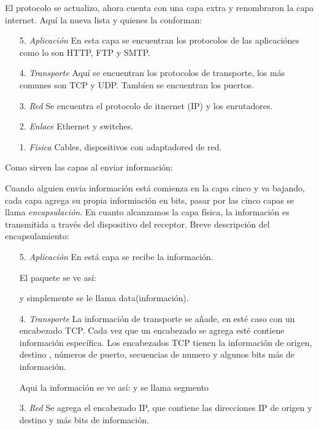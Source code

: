 \documentclass[8pt, letterpaper]{article}
\begin{document}
\begin{enumerate}
      \hfill\break
      El protocolo se actualizo, ahora cuenta con una capa extra y renombraron
      la capa internet. Aquí la nueva lista y quienes la conforman:
      \begin{enumerate}
      \item[5.]\textit{Aplicación}
        \hfill\break
        En esta capa se encuentran los protocolos de las aplicaciónes como
        lo son HTTP, FTP y SMTP.
      \item[4.] \textit{Transporte}
        Aquí se encuentran los protocolos de transporte, los más comunes son
        TCP y UDP. Tambíen se encuentran los puertos.
      \item[3.] \textit{Red}
        Se encuentra el protocolo de itnernet (IP) y los enrutadores.
      \item[2.] \textit{Enlace}
        Ethernet y switches.
      \item[1.]\textit{Fisica}
        Cables, dispositivos con adaptadored de red.
      \end{enumerate}
      Como sirven las capas al enviar información:
      
      Cuando alguien envia información está comienza en la capa cinco y va
      bajando, cada capa agrega su propia informiación en bits, pasar por las
      cinco capas se llama \textit{encapsulación}. En cuanto alcanzamos la
      capa física, la información es transmitida a través del dispositivo del
      receptor. Breve descripción del encapsulamiento:
      \begin{enumerate}
      \item[5.]\textit{Aplicación}
        \hfill\break
        En está capa se recibe la información.
        
        El paquete se ve así:
        
        \hfill\break
        [DATA] y simplemente se le llama data(información).
      \item[4.] \textit{Transporte}
        \hfill\break
        La información de transporte se añade, en esté caso con un encabezado
        TCP. Cada vez que un encabezado se agrega esté contiene información
        específica. Los encabezados TCP tienen la información de origen, destino
        , números de puerto, secuencias de numero y algunos bits más de
        información.
        
        \hfill\break
        Aqui la información se ve así:
        \hfill\break
        [TCP][DATA]
        y se llama segmento
      \item[3.] \textit{Red}
        \hfill\break
        Se agrega el encabezado IP, que contiene las direcciones IP de origen
        y destino y más bits de información.
        

\end{enumerate}
\end{enumerate}
\end{document}
